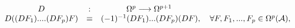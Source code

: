 \begin{equation}\label{GRAD}
\begin{array}{ccc}
  D &:&  \Omega^p  \longrightarrow \Omega^{p+1} \hskip 4cm \\
  D((DF_1)....(DF_p) F) &\equiv& (-1)^{-1} (DF_1)...(DF_p) (DF),
  ~~~\forall F, F_1,..., F_p \in \Omega^p({\cal A}),
\end{array}
\end{equation}

